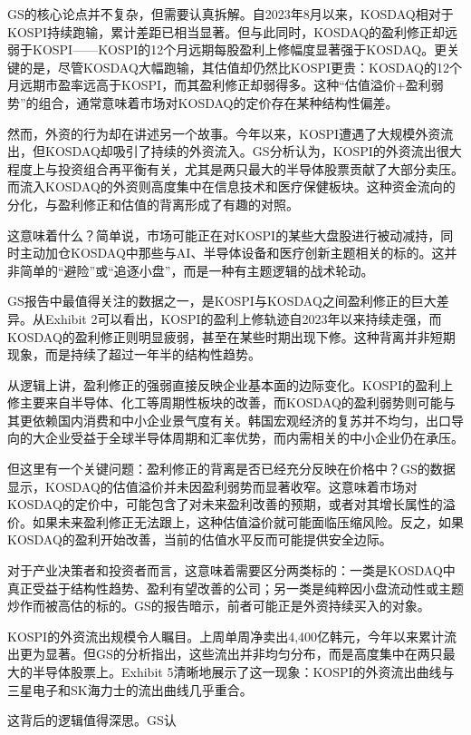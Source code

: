 \documentclass[11pt]{ctexart}
\begin{document}
GS的核心论点并不复杂，但需要认真拆解。自2023年8月以来，KOSDAQ相对于KOSPI持续跑输，累计差距已相当显著。但与此同时，KOSDAQ的盈利修正却远弱于KOSPI——KOSPI的12个月远期每股盈利上修幅度显著强于KOSDAQ。更关键的是，尽管KOSDAQ大幅跑输，其估值却仍然比KOSPI更贵：KOSDAQ的12个月远期市盈率远高于KOSPI，而其盈利修正却弱得多。这种“估值溢价+盈利弱势”的组合，通常意味着市场对KOSDAQ的定价存在某种结构性偏差。

然而，外资的行为却在讲述另一个故事。今年以来，KOSPI遭遇了大规模外资流出，但KOSDAQ却吸引了持续的外资流入。GS分析认为，KOSPI的外资流出很大程度上与投资组合再平衡有关，尤其是两只最大的半导体股票贡献了大部分卖压。而流入KOSDAQ的外资则高度集中在信息技术和医疗保健板块。这种资金流向的分化，与盈利修正和估值的背离形成了有趣的对照。

这意味着什么？简单说，市场可能正在对KOSPI的某些大盘股进行被动减持，同时主动加仓KOSDAQ中那些与AI、半导体设备和医疗创新主题相关的标的。这并非简单的“避险”或“追逐小盘”，而是一种有主题逻辑的战术轮动。

GS报告中最值得关注的数据之一，是KOSPI与KOSDAQ之间盈利修正的巨大差异。从Exhibit 2可以看出，KOSPI的盈利上修轨迹自2023年以来持续走强，而KOSDAQ的盈利修正则明显疲弱，甚至在某些时期出现下修。这种背离并非短期现象，而是持续了超过一年半的结构性趋势。

从逻辑上讲，盈利修正的强弱直接反映企业基本面的边际变化。KOSPI的盈利上修主要来自半导体、化工等周期性板块的改善，而KOSDAQ的盈利弱势则可能与其更依赖国内消费和中小企业景气度有关。韩国宏观经济的复苏并不均匀，出口导向的大企业受益于全球半导体周期和汇率优势，而内需相关的中小企业仍在承压。

但这里有一个关键问题：盈利修正的背离是否已经充分反映在价格中？GS的数据显示，KOSDAQ的估值溢价并未因盈利弱势而显著收窄。这意味着市场对KOSDAQ的定价中，可能包含了对未来盈利改善的预期，或者对其增长属性的溢价。如果未来盈利修正无法跟上，这种估值溢价就可能面临压缩风险。反之，如果KOSDAQ的盈利开始改善，当前的估值水平反而可能提供安全边际。

对于产业决策者和投资者而言，这意味着需要区分两类标的：一类是KOSDAQ中真正受益于结构性趋势、盈利有望改善的公司；另一类是纯粹因小盘流动性或主题炒作而被高估的标的。GS的报告暗示，前者可能正是外资持续买入的对象。

KOSPI的外资流出规模令人瞩目。上周单周净卖出4,400亿韩元，今年以来累计流出更为显著。但GS的分析指出，这些流出并非均匀分布，而是高度集中在两只最大的半导体股票上。Exhibit 5清晰地展示了这一现象：KOSPI的外资流出曲线与三星电子和SK海力士的流出曲线几乎重合。

这背后的逻辑值得深思。GS认
\end{document}
